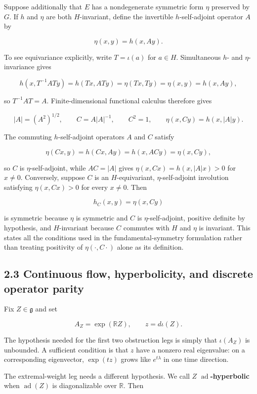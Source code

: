 \documentclass[
  10pt,
  letterpaper,
  oneside]{scrartcl}
\begin{document}
Suppose additionally that \(E\) has a nondegenerate symmetric form
\(\eta\) preserved by \(G\). If \(h\) and \(\eta\) are both
\(H\)-invariant, define the invertible \(h\)-self-adjoint operator \(A\)
by

\[
\eta(x,y)=h(x,Ay).
\]

To see equivariance explicitly, write \(T=\iota(a)\) for \(a\in H\).
Simultaneous \(h\)- and \(\eta\)-invariance gives

\[
h(x,T^{-1}ATy)=h(Tx,ATy)=\eta(Tx,Ty)=\eta(x,y)=h(x,Ay),
\]

so \(T^{-1}AT=A\). Finite-dimensional functional calculus therefore
gives

\[
|A|=(A^2)^{1/2},
\qquad C=A|A|^{-1},
\qquad C^2=1,
\qquad \eta(x,Cy)=h(x,|A|y).
\]

The commuting \(h\)-self-adjoint operators \(A\) and \(C\) satisfy

\[
\eta(Cx,y)=h(Cx,Ay)=h(x,ACy)=\eta(x,Cy),
\]

so \(C\) is \(\eta\)-self-adjoint, while \(AC=|A|\) gives
\(\eta(x,Cx)=h(x,|A|x)>0\) for \(x\ne0\). Conversely, suppose \(C\) is
an \(H\)-equivariant, \(\eta\)-self-adjoint involution satisfying
\(\eta(x,Cx)>0\) for every \(x\ne0\). Then

\[
h_C(x,y)=\eta(x,Cy)
\]

is symmetric because \(\eta\) is symmetric and \(C\) is
\(\eta\)-self-adjoint, positive definite by hypothesis, and
\(H\)-invariant because \(C\) commutes with \(H\) and \(\eta\) is
invariant. This states all the conditions used in the
fundamental-symmetry formulation rather than treating positivity of
\(\eta(\cdot,C\cdot)\) alone as its definition.

\subsection{2.3 Continuous flow, hyperbolicity, and discrete operator
parity}\label{continuous-flow-hyperbolicity-and-discrete-operator-parity}

Fix \(Z\in\mathfrak g\) and set

\[
A_Z=\exp(\mathbb R Z),
\qquad z=d\iota(Z).
\]

The hypothesis needed for the first two obstruction legs is simply that
\(\iota(A_Z)\) is unbounded. A sufficient condition is that \(z\) have a
nonzero real eigenvalue: on a corresponding eigenvector, \(\exp(tz)\)
grows like \(e^{t\lambda}\) in one time direction.

The extremal-weight leg needs a different hypothesis. We call \(Z\)
\textbf{\(\operatorname{ad}\)-hyperbolic} when \(\operatorname{ad}(Z)\)
is diagonalizable over \(\mathbb R\). Then
\end{document}
